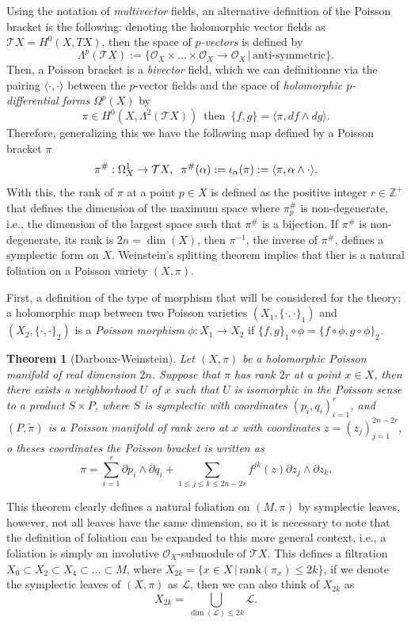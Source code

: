 \documentclass[12pt,twoside,a4paper]{report}
\newtheorem{theorem}{Theorem}[section]
\newcommand{\zah}{\ensuremath{ \mathbb Z }}
\newcommand{\om}{\ensuremath{\Omega}}
\newcommand{\osheaf}{\ensuremath{\mathcal O }}
\begin{document}
Using the notation of \emph{multivector} fields, an alternative definition of the Poisson bracket is the following: denoting the holomorphic vector fields as $\mathcal{T}X=H^0(X,TX)$,
then the space of \emph{$p$-vectors} is defined by
\[
    \Lambda^{p}(\mathcal{T}X):=\{\osheaf_X\times\dots\times\osheaf_X\rightarrow\osheaf_X\,\vert\,\text{anti-symmetric}\}.
\]
Then, a Poisson bracket is a \emph{bivector} field, which we can definitionne via the pairing $\langle\cdot,\cdot\rangle$
between the $p$-vector fields and the space of \emph{holomorphic $p$-differential forms} $\om^{p}(X)$ by
\[
        \pi\in H^0(X,\Lambda^2(\mathcal{T}X))\,\text{ then }\,\{f,g\}=\langle \pi,df\wedge dg\rangle.
\]
Therefore, generalizing this we have the following map defined by a Poisson bracket $\pi$
\[
        \pi^{\#}:\om^1_X\rightarrow\mathcal{T}X,\hspace{0.2cm}\pi^{\#}(\alpha):=\iota_{\alpha}(\pi):=\langle\pi,\alpha\wedge\cdot\rangle.
\]
\noindent With this, the rank of $\pi$ at a point $p\in X$ is defined as the positive integer $r\in \zah^{+}$ that defines the dimension of the maximum space where $\pi^{\#}_p$ is non-degenerate, i.e., the dimension of the largest space such that $\pi^{\#}$ is a bijection. If $\pi^{\#}$ is non-degenerate, its rank is $2n=\dim(X)$, then $\pi^{-1}$, the inverse of $\pi^{\#}$, defines a symplectic form on $X$. Weinstein's splitting theorem implies that ther is a natural foliation on a Poisson variety $(X,\pi)$.

First, a definition of the type of morphism that will be considered for the theory; a holomorphic map between two Poisson varieties $(X_1,\{\cdot,\cdot\}_1)$ and $(X_2,\{\cdot,\cdot\}_2)$ is a \emph{Poisson morphism} $\phi:X_1\to X_2$ if $\{f,g\}_1\circ\phi=\{f\circ\phi,g\circ\phi\}_2$.
\begin{theorem}[Darboux-Weinstein]\label{weins}
        Let $(X,\pi)$ be a holomorphic Poisson manifold of real dimension $2n$. Suppose that $\pi$ has rank $2r$ at a point $x\in X$,
        then there exists a neighborhood $U$ of $x$ such that $U$ is isomorphic in the Poisson sense to a product $S\times P$, where $S$ is symplectic with coordinates $(p_i,q_i)_{i=1}^r$, and $(P,\tilde{\pi})$ is a Poisson manifold of rank zero at $x$ with coordinates $z=(z_j)_{j=1}^{2n-2r}$, o theses coordinates the Poisson bracket is written as
        \[
                \pi=\sum_{i=1}^r \partial{p_i}\wedge\partial{q_i}+\sum_{1\leq j\leq k\leq 2n-2r} f^{jk}(z)\partial{z_j}\wedge\partial{z_k}.
        \]
\end{theorem}
\noindent This theorem clearly defines a natural foliation on $(M,\pi)$ by symplectic leaves, however, not all leaves have the same dimension, so it is necessary to note that the definition of foliation can be expanded to this more general context, i.e., a foliation is simply an involutive $\osheaf_X$-submodule of $\mathcal{T}X$. This defines a filtration $X_0\subset X_2\subset X_4\subset\dots\subset M$, where \hbox{$X_{2k}=\{x\in X\,|\,\textrm{rank}(\pi_x)\leq 2k\}$},
if we denote the symplectic leaves of $(X,\pi)$ as $\mathcal{L}$, then we can also think of $X_{2k}$ as
\[
X_{2k}=\bigcup_{\dim(\mathcal{L})\leq 2k}\mathcal{L}.
\]
\end{document}
